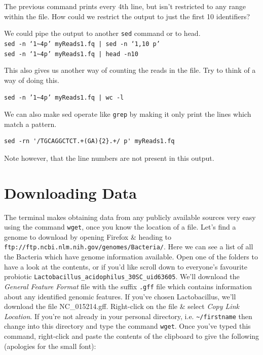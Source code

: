 \documentclass[a4paper,12pt,twoside]{memoir}
\begin{document}
\begin{questions}
The previous command prints every 4th line, but isn't restricted to any range within the file.
How could we restrict the output to just the first 10 identifiers? \\
\begin{answer}
We could pipe the output to another \texttt{sed} command or  to head.\\
\texttt{sed -n `1\~{}4p' myReads1.fq | sed -n `1,10 p'} \\
\texttt{sed -n `1\~{}4p' myReads1.fq | head -n10} \\
\end{answer}

This also gives us another way of counting the reads in the file.
Try to think of a way of doing this.
\begin{answer}
\texttt{sed -n '1\~{}4p' myReads1.fq | wc -l} \\
\end{answer}
\end{questions}

\begin{steps}
We can also make sed operate like \texttt{grep} by making it only print the lines which match a pattern.
\begin{lstlisting}
sed -rn '/TGCAGGCTCT.+(GA){2}.+/ p' myReads1.fq
\end{lstlisting}
Note however, that the line numbers are not present in this output.
\end{steps}


\section{Downloading Data}

\begin{steps}
The terminal makes obtaining data from any publicly available sources very easy using the command \texttt{wget}, once you know the location of a file.
Let's find a genome to download by opening Firefox \& heading to \texttt{ftp://ftp.ncbi.nlm.nih.gov/genomes/Bacteria/}.
Here we can see a list of all the Bacteria which have genome information available.
Open one of the folders to have a look at the contents, or if you'd like scroll down to everyone's favourite probiotic \texttt{Lactobacillus_acidophilus_30SC_uid63605}.
We'll download the \textit{General Feature Format} file with the suffix \texttt{.gff} file which contains information about any identified genomic features.
If you've chosen Lactobacillus, we'll download the file NC_015214.gff.
Right-click on the file \& select \textit{Copy Link Location}.
If you're not already in your personal directory, i.e. \texttt{\~{}/firstname} then change into this directory and type the command \texttt{wget}.
Once you've typed this command, right-click and paste the contents of the clipboard to give the following (apologies for the small font):
\end{steps}
\end{document}
